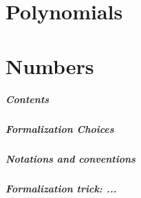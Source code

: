 \chapter{Polynomials}

\chapter{Numbers}

\paragraph{Contents}

\paragraph{Formalization Choices}

\paragraph{Notations and conventions}

\paragraph{Formalization trick: ...}


